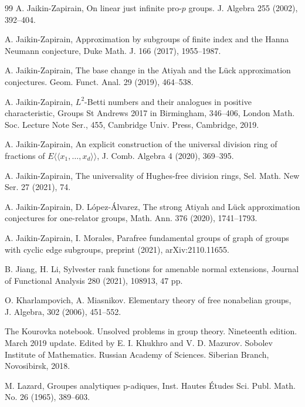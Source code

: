 \documentclass[11pt]{amsart}
\numberwithin{claimcounter}{lem}
\begin{document}
\begin{thebibliography}{99}
    A. Jaikin-Zapirain,   On linear just infinite pro-$p$ groups. J. Algebra 255 (2002), 392--404.
  
   A. Jaikin-Zapirain, Approximation by subgroups of finite index and the Hanna Neumann conjecture, Duke Math. J. 166 (2017),  1955--1987.


  A. Jaikin-Zapirain,  The base change in the Atiyah and the L\"uck approximation conjectures. Geom. Funct. Anal. 29 (2019),   464--538.
  
   A. Jaikin-Zapirain, $L^2$-Betti numbers and their analogues in positive characteristic, Groups St Andrews 2017 in Birmingham, 346--406, London Math. Soc. Lecture Note Ser., 455, Cambridge Univ. Press, Cambridge, 2019. 
  
  
  
  A. Jaikin-Zapirain, An explicit construction of the universal division ring of fractions of $E\langle \! \langle  x_1,\ldots, x_d\rangle \! \rangle $,     J. Comb. Algebra 4 (2020), 369--395.   
 
 
   A. Jaikin-Zapirain, The universality of Hughes-free division rings, Sel. Math. New Ser. 27 (2021), 74.


  
  
     A. Jaikin-Zapirain, D. L\'opez-\'Alvarez, The strong Atiyah and L\"uck approximation conjectures for one-relator groups,  Math. Ann. 376 (2020), 1741--1793.
   
    A. Jaikin-Zapirain, I. Morales, Parafree fundamental groups of graph of groups with cyclic edge subgroups, preprint (2021), arXiv:2110.11655.

   
    B. Jiang, H. Li, Sylvester rank functions for amenable normal extensions,  	Journal of Functional Analysis
 280  (2021), 108913, 47 pp. 
  
   O. Kharlampovich,  A. Miasnikov. Elementary theory of free nonabelian
groups,  J. Algebra,
302 (2006), 451--552.
  
   The Kourovka notebook. Unsolved problems in group theory. Nineteenth edition. March 2019 update. Edited by E. I. Khukhro and V. D. Mazurov. Sobolev Institute of Mathematics. Russian Academy of Sciences. Siberian Branch, Novosibirsk, 2018.
  
    M. Lazard,  Groupes analytiques p-adiques, Inst. Hautes \'Etudes Sci. Publ. Math. No. 26 (1965), 389--603.
  

\end{thebibliography}
\end{document}

